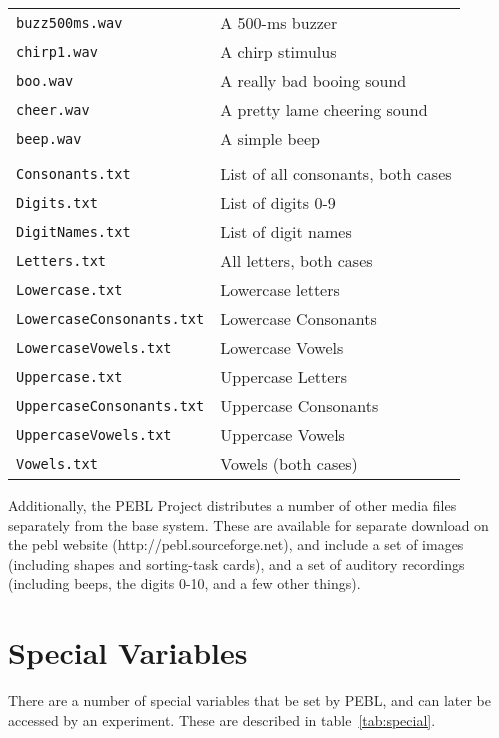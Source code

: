 \begin{longtable}{ll}
\texttt{buzz500ms.wav}   &A 500-ms buzzer\\
\texttt{chirp1.wav}      &A chirp stimulus\\
\texttt{boo.wav}         &A really bad booing sound\\
\texttt{cheer.wav}       &A pretty lame cheering sound\\
\texttt{beep.wav}        &A simple beep\\
\addlinespace[.1cm]
\midrule
\addlinespace[.2cm]
\multicolumn{2}{l}{\textbf{In `media/text/'}:}\\
\addlinespace[.2cm]
\texttt{Consonants.txt}  &List of all consonants, both cases\\
\texttt{Digits.txt}               &List of digits 0-9\\
\texttt{DigitNames.txt}           &List of digit names\\
\texttt{Letters.txt}              &All letters, both cases\\
\texttt{Lowercase.txt}            &Lowercase letters\\
\texttt{LowercaseConsonants.txt}  &Lowercase Consonants\\
\texttt{LowercaseVowels.txt}      &Lowercase Vowels\\
\texttt{Uppercase.txt}            &Uppercase Letters\\
\texttt{UppercaseConsonants.txt}  &Uppercase Consonants\\
\texttt{UppercaseVowels.txt}      &Uppercase Vowels\\
\texttt{Vowels.txt}               &Vowels (both cases)\\

\end{longtable}

Additionally, the PEBL Project distributes a number of other media
files separately from the base system.  These are available for separate
download on the pebl website (http://pebl.sourceforge.net), and
include a set of images (including shapes and sorting-task cards), and
a set of auditory recordings (including beeps, the digits 0-10, and a
few other things).

\vspace{1cm}


\section{Special Variables}

There are a number of special variables that be set by PEBL, 
and can later be accessed by an experiment. These are described in table~\ref{tab:special}.

